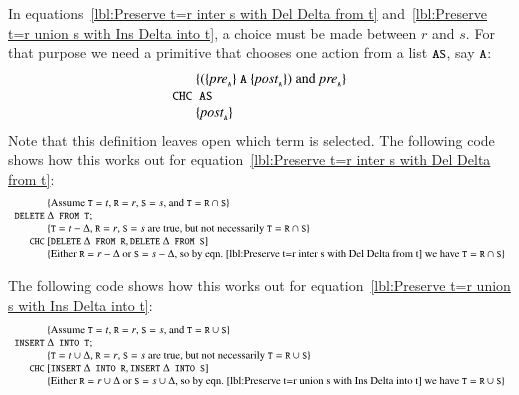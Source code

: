 \documentclass{elsarticle}
\begin{document}
	In equations~\ref{lbl:Preserve t=r inter s with Del Delta from t} and~\ref{lbl:Preserve t=r union s with Ins Delta into t},
	a choice must be made between $r$ and $s$. For that purpose we need a primitive  that chooses one action from a list $\text{\tt\small AS}$, say $\text{\tt\small A}$:
\[\begin{array}{r@{~}l}
&\{ (\{\id{pre}_{\code{\tiny A}}\}\ \code{A}\ \{\id{post}_{\code{\tiny A}}\})\text{ and } \id{pre}_{\code{\tiny A}} \}\\
\code{CHC}&\ \code{AS}\\
&\{\id{post}_{\code{\tiny A}}\}
\end{array}\]
	Note that this definition leaves open which term is selected.
	The following code shows how this works out for equation~\ref{lbl:Preserve t=r inter s with Del Delta from t}:
\[\begin{array}{r@{~}l}
&\{\text{Assume $\code{T}=t$, $\code{R}=r$, $\code{S}=s$, and $\code{T}=\code{R}\cap\code{S}$}\}\\
\code{DELETE}&\Delta\code{ FROM T};\\
&\{\text{$\code{T}=t-\Delta$, $\code{R}=r$, $\code{S}=s$ are true, but not necessarily $\code{T}=\code{R}\cap\code{S}$}\}\\
\code{CHC}&[\code{DELETE}\ \Delta\code{ FROM R},\code{DELETE}\ \Delta\code{ FROM S}]\\
&\{\text{Either }\code{R}=r-\Delta\text{ or }\code{S}=s-\Delta\text{, so by eqn.~\ref{lbl:Preserve t=r inter s with Del Delta from t} we have }\code{T}=\code{R}\cap\code{S}\}
\end{array}\]

	The following code shows how this works out for equation~\ref{lbl:Preserve t=r union s with Ins Delta into t}:
\[\begin{array}{r@{~}l}
&\{\text{Assume $\code{T}=t$, $\code{R}=r$, $\code{S}=s$, and $\code{T}=\code{R}\cup\code{S}$}\}\\
\code{INSERT}&\Delta\code{ INTO T};\\
&\{\text{$\code{T}=t\cup\Delta$, $\code{R}=r$, $\code{S}=s$ are true, but not necessarily $\code{T}=\code{R}\cup\code{S}$}\}\\
\code{CHC}&[\code{INSERT}\ \Delta\code{ INTO R},\code{INSERT}\ \Delta\code{ INTO S}]\\
&\{\text{Either }\code{R}=r\cup\Delta\text{ or }\code{S}=s\cup\Delta\text{, so by eqn.~\ref{lbl:Preserve t=r union s with Ins Delta into t} we have }\code{T}=\code{R}\cup\code{S}\}
\end{array}\]
\end{document}
